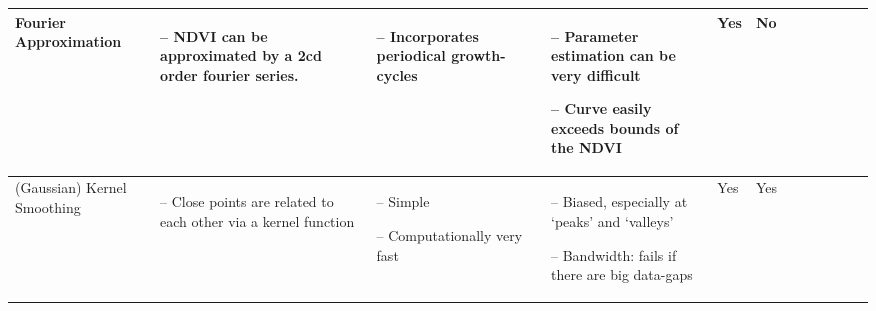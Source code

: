 \begin{table}[!ht]
\begin{tabular}{p{1.6cm}p{3.3cm}p{3.3cm}p{3.4cm}p{0.4cm}p{0.4cm}p{3cm}p{3cm}p{3cm}p{3cm}p{2.7cm}p{3cm}|}
		Fourier Approximation                                                                                                                                              &
		\begin{cptitemize} \item[--]  NDVI can be approximated by a 2cd order fourier series.                            \end{cptitemize}        &
		\begin{cptitemize} \item[--]  Incorporates periodical growth-cycles                                 \end{cptitemize}        &
		\begin{cptitemize} \item[--]  Parameter estimation can be very difficult \item[--]  Curve easily exceeds bounds of the NDVI             \end{cptitemize}        &
		Yes                                                                                                                                                          &
		No                                                                                                                                                         \\ \hline%

		(Gaussian) Kernel Smoothing                                                                                                                                  &
		\begin{cptitemize} \item[--]  Close points are related to each other via a kernel function \end{cptitemize}                                                                                                                                                            &
		\begin{cptitemize} \item[--]  Simple  \item[--]  Computationally very fast                                                             \end{cptitemize}        &
		\begin{cptitemize} \item[--]  Biased, especially at `peaks' and `valleys'   \item[--]  Bandwidth: fails if there are big data-gaps                                                     \end{cptitemize}               &
		Yes                                                                                                                                                          &
		Yes                                                                                                                                                            \\ \hline%


\end{tabular}
\end{table}
